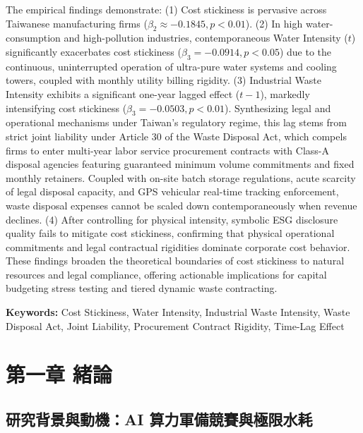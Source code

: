 \documentclass[12pt,a4paper]{article}
\begin{document}
The empirical findings demonstrate: (1) Cost stickiness is pervasive across Taiwanese manufacturing firms ($\beta_2 \approx -0.1845, p < 0.01$). (2) In high water-consumption and high-pollution industries, contemporaneous Water Intensity ($t$) significantly exacerbates cost stickiness ($\beta_3 = -0.0914, p < 0.05$) due to the continuous, uninterrupted operation of ultra-pure water systems and cooling towers, coupled with monthly utility billing rigidity. (3) Industrial Waste Intensity exhibits a significant one-year lagged effect ($t-1$), markedly intensifying cost stickiness ($\beta_3 = -0.0503, p < 0.01$). Synthesizing legal and operational mechanisms under Taiwan's regulatory regime, this lag stems from strict joint liability under Article 30 of the Waste Disposal Act, which compels firms to enter multi-year labor service procurement contracts with Class-A disposal agencies featuring guaranteed minimum volume commitments and fixed monthly retainers. Coupled with on-site batch storage regulations, acute scarcity of legal disposal capacity, and GPS vehicular real-time tracking enforcement, waste disposal expenses cannot be scaled down contemporaneously when revenue declines. (4) After controlling for physical intensity, symbolic ESG disclosure quality fails to mitigate cost stickiness, confirming that physical operational commitments and legal contractual rigidities dominate corporate cost behavior. These findings broaden the theoretical boundaries of cost stickiness to natural resources and legal compliance, offering actionable implications for capital budgeting stress testing and tiered dynamic waste contracting.

\vspace{1em}
\noindent \textbf{Keywords:} Cost Stickiness, Water Intensity, Industrial Waste Intensity, Waste Disposal Act, Joint Liability, Procurement Contract Rigidity, Time-Lag Effect

\newpage

\tableofcontents
\newpage

\listoftables
\newpage

\section{第一章 緒論}

\subsection{研究背景與動機：AI 算力軍備競賽與極限水耗}
\end{document}
